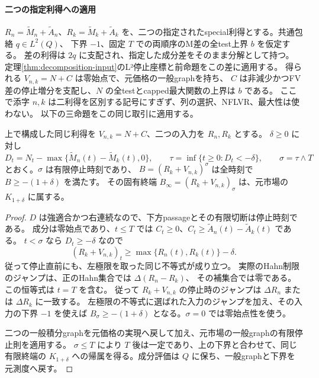 \paragraph{二つの指定利得への適用}
$R_n=\widetilde M_n+\widetilde A_n$、$R_k=\widetilde M_k+\widetilde A_k$ を、二つの指定されたspecial利得とする。共通包絡 $q\in L^2(Q)$、
下界 $-1$、固定 $T$ での両順序のM差の全test上界 $b$ を仮定する。
差の利得は $2q$ に支配され、指定した成分差をそのまま分解として持つ。
定理\ref{thm:decomposition-input}のL²停止座標と前命題をこの差に適用する。
得られる $V_{n,k}=N+C$ は零始点で、元価格の一般graphを持ち、
$C$ は非減少かつFV差の停止増分を支配し、$N$ の全testとcapped最大関数の上界は $b$ である。
ここで添字 $n,k$ は二利得を区別する記号にすぎず、列の選択、NFLVR、最大性は使わない。
以下の三命題をこの同じ取引に適用する。

\begin{proposition}[Hahn改善利得の閉じた有限停止と許容性]
上で構成した同じ利得を $V_{n,k}=N+C$、二つの入力を $R_n,R_k$ とする。
$\delta\geq0$ に対し
\[
 D_t=N_t-\max\{\widetilde M_n(t)-\widetilde M_k(t),0\},\qquad
 \tau=\inf\{t\geq0:D_t<-\delta\},\qquad \sigma=\tau\wedge T
\]
とおく。$\sigma$ は有限停止時刻であり、
$B=(R_k+V_{n,k})^\sigma$ は全時刻で $B\geq-(1+\delta)$ を満たす。
その固有終端 $B_\infty=(R_k+V_{n,k})_\sigma$ は、元市場の $K_{1+\delta}$ に属する。
\end{proposition}
\begin{proof}
$D$ は強適合かつ右連続なので、下方passageとその有限切断は停止時刻である。
成分は零始点であり、$t\leq T$ では
$C_t\geq0$、$C_t\geq\widetilde A_n(t)-\widetilde A_k(t)$ である。
$t<\sigma$ なら $D_t\geq-\delta$ なので
\[
 (R_k+V_{n,k})_t\geq\max\{R_n(t),R_k(t)\}-\delta.
\]
従って停止直前にも、左極限を取った同じ不等式が成り立つ。
実際のHahn制限のジャンプは、正のHahn集合では $\Delta(R_n-R_k)$、
その補集合では零である。この恒等式は $t=T$ を含む。
従って $R_k+V_{n,k}$ の停止時のジャンプは $\Delta R_n$ または $\Delta R_k$ に一致する。
左極限の不等式に選ばれた入力のジャンプを加え、その入力の下界 $-1$ を使えば
$B_\sigma\geq-(1+\delta)$ となる。$\sigma=0$ では零始点性を使う。

二つの一般積分graphを元価格の実現へ戻して加え、元市場の一般graphの有限停止則を適用する。
$\sigma\leq T$ により $T$ 後は一定であり、上の下界と合わせて、同じ有限終端の
$K_{1+\delta}$ への帰属を得る。成分評価は $Q$ に保ち、一般graphと下界を元測度へ戻す。
\end{proof}

